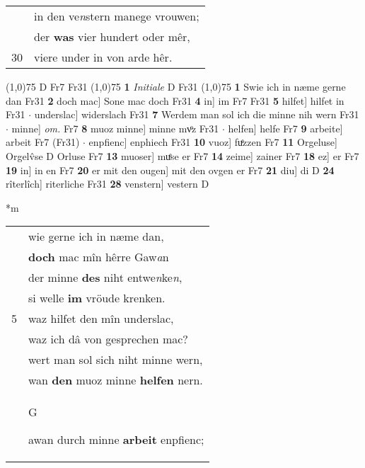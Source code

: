 \documentclass[8pt,a4paper,notitlepage]{article}
\begin{document}
\begin{table}[ht]
\begin{minipage}[t]{0.5\linewidth}
\begin{tabular}{rl}
 & in den ve\textit{n}stern manege vrouwen;\\ 
 & der \textbf{was} vier hundert oder mêr,\\ 
30 & viere under in von arde hêr.\\ 
\end{tabular}
\scriptsize
\line(1,0){75} \newline
D Fr7 Fr31 \newline
\line(1,0){75} \newline
\textbf{1} \textit{Initiale} D Fr31  \newline
\line(1,0){75} \newline
\textbf{1} Swie ich in næme gerne dan Fr31 \textbf{2} doch mac] Sone mac doch Fr31 \textbf{4} in] im Fr7 Fr31 \textbf{5} hilfet] hilfet in Fr31  $\cdot$ underslac] widerslach Fr31 \textbf{7} Werdem man sol ich die minne nih wern Fr31  $\cdot$ minne] \textit{om.} Fr7 \textbf{8} muoz minne] minne mvͦz Fr31  $\cdot$ helfen] helfe Fr7 \textbf{9} arbeite] arbeit Fr7 (Fr31)  $\cdot$ enpfienc] enphiech Fr31 \textbf{10} vuoz] fuͤzzen Fr7 \textbf{11} Orgeluse] Orgelv̂se D Orluse Fr7 \textbf{13} muoser] muͤse er Fr7 \textbf{14} zeime] zainer Fr7 \textbf{18} ez] er Fr7 \textbf{19} in] in en Fr7 \textbf{20} er mit den ougen] mit den ovgen er Fr7 \textbf{21} diu] di D \textbf{24} rîterlîch] riterliche Fr31 \textbf{28} venstern] vestern D \newline
\end{minipage}
\hspace{0.5cm}
\begin{minipage}[t]{0.5\linewidth}
\small
\begin{center}*m
\end{center}
\begin{tabular}{rl}
 & wie gerne ich in næme dan,\\ 
 & \textbf{doch} mac mîn hêrre Gaw\textit{a}n\\ 
 & der minne \textbf{des} niht entwe\textit{n}ke\textit{n},\\ 
 & si welle \textbf{im} vröude krenken.\\ 
5 & waz hilfet den mîn underslac,\\ 
 & waz ich dâ von gesprechen mac?\\ 
 & wert man sol sich niht minne wern,\\ 
 & wan \textbf{den} muoz minne \textbf{helfen} nern.\\ 
 & \begin{large}G\end{large}awan durch minne \textbf{arbeit} enpfienc;\\ 

\end{tabular}
\end{minipage}
\end{table}
\end{document}
